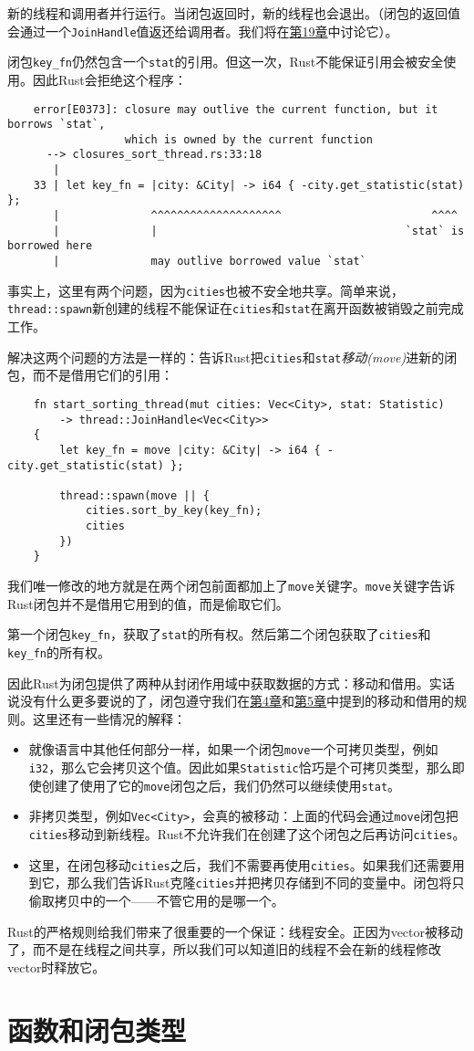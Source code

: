 新的线程和调用者并行运行。当闭包返回时，新的线程也会退出。（闭包的返回值会通过一个\texttt{JoinHandle}值返还给调用者。我们将在\hyperref[ch19]{第19章}中讨论它）。

闭包\texttt{key\_fn}仍然包含一个\texttt{stat}的引用。但这一次，Rust不能保证引用会被安全使用。因此Rust会拒绝这个程序：
\begin{verbatim}
    error[E0373]: closure may outlive the current function, but it borrows `stat`,
                  which is owned by the current function
      --> closures_sort_thread.rs:33:18
       |
    33 | let key_fn = |city: &City| -> i64 { -city.get_statistic(stat) };
       |              ^^^^^^^^^^^^^^^^^^^^                       ^^^^
       |              |                                      `stat` is borrowed here
       |              may outlive borrowed value `stat`
\end{verbatim}

事实上，这里有两个问题，因为\texttt{cities}也被不安全地共享。简单来说，\texttt{thread::spawn}新创建的线程不能保证在\texttt{cities}和\texttt{stat}在离开函数被销毁之前完成工作。

解决这两个问题的方法是一样的：告诉Rust把\texttt{cities}和\texttt{stat}\emph{移动(move)}进新的闭包，而不是借用它们的引用：
\begin{verbatim}
    fn start_sorting_thread(mut cities: Vec<City>, stat: Statistic)
        -> thread::JoinHandle<Vec<City>>
    {
        let key_fn = move |city: &City| -> i64 { -city.get_statistic(stat) };

        thread::spawn(move || {
            cities.sort_by_key(key_fn);
            cities
        })
    }
\end{verbatim}

我们唯一修改的地方就是在两个闭包前面都加上了\texttt{move}关键字。\texttt{move}关键字告诉Rust闭包并不是借用它用到的值，而是偷取它们。

第一个闭包\texttt{key\_fn}，获取了\texttt{stat}的所有权。然后第二个闭包获取了\texttt{cities}和\texttt{key\_fn}的所有权。

因此Rust为闭包提供了两种从封闭作用域中获取数据的方式：移动和借用。实话说没有什么更多要说的了，闭包遵守我们在\hyperref[ch04]{第4章}和\hyperref[ch05]{第5章}中提到的移动和借用的规则。这里还有一些情况的解释：
\begin{itemize}
    \item 就像语言中其他任何部分一样，如果一个闭包\texttt{move}一个可拷贝类型，例如\texttt{i32}，那么它会拷贝这个值。因此如果\texttt{Statistic}恰巧是个可拷贝类型，那么即使创建了使用了它的\texttt{move}闭包之后，我们仍然可以继续使用\texttt{stat}。
    \item 非拷贝类型，例如\texttt{Vec<City>}，会真的被移动：上面的代码会通过\texttt{move}闭包把\texttt{cities}移动到新线程。Rust不允许我们在创建了这个闭包之后再访问\texttt{cities}。
    \item 这里，在闭包移动\texttt{cities}之后，我们不需要再使用\texttt{cities}。如果我们还需要用到它，那么我们告诉Rust克隆\texttt{cities}并把拷贝存储到不同的变量中。闭包将只偷取拷贝中的一个——不管它用的是哪一个。
\end{itemize}

Rust的严格规则给我们带来了很重要的一个保证：线程安全。正因为vector被移动了，而不是在线程之间共享，所以我们可以知道旧的线程不会在新的线程修改vector时释放它。

\section{函数和闭包类型}\label{fn}

